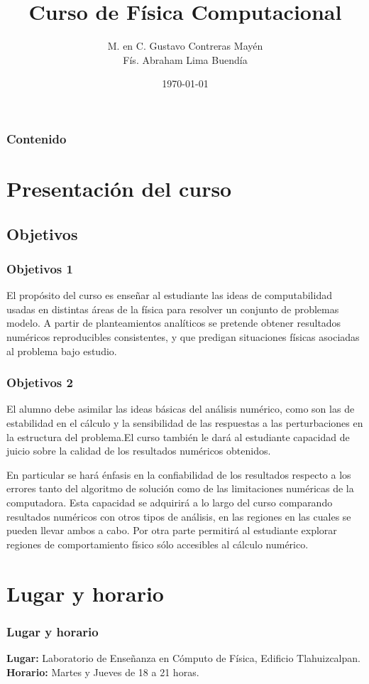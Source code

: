 \documentclass[12pt]{beamer}
\title{Curso de Física Computacional}
\author[]{M. en C. Gustavo Contreras Mayén \\ Fís. Abraham Lima Buendía}
\date{\today}
\begin{document}
\maketitle
\fontsize{14}{14}\selectfont
{}
\begin{frame}
\frametitle{Contenido}
\tableofcontents[pausesections]
\end{frame}
\section{Presentación del curso}
\subsection{Objetivos}
\begin{frame}
\frametitle{Objetivos 1}
El propósito del curso es enseñar al estudiante las ideas de computabilidad usadas en distintas áreas de la  física para resolver un conjunto de problemas modelo. A partir de planteamientos analíticos se pretende obtener resultados numéricos reproducibles consistentes, y que predigan situaciones físicas asociadas al problema bajo estudio.
\end{frame}
\begin{frame}
\frametitle{Objetivos 2}
El alumno debe asimilar las ideas básicas del análisis numérico, como son las de estabilidad en el cálculo y la sensibilidad de las respuestas a las perturbaciones en la estructura del problema.El curso también le dará al estudiante capacidad de juicio sobre la calidad de los resultados numéricos obtenidos.
\end{frame}
\begin{frame}
En particular se hará énfasis en la confiabilidad de los resultados respecto a los errores tanto del algoritmo de solución como de las limitaciones numéricas de la computadora. Esta capacidad se adquirirá a lo largo del curso comparando resultados numéricos con otros tipos de análisis, en las regiones en las cuales se pueden llevar ambos a cabo. Por otra parte permitirá al estudiante explorar regiones de comportamiento físico sólo accesibles al cálculo numérico.
\end{frame}
\section{Lugar y horario}
\begin{frame}
\frametitle{Lugar y horario} 
\textbf{Lugar: }Laboratorio de Enseñanza en Cómputo de Física, Edificio Tlahuizcalpan.
\\
\bigskip
\textbf{Horario: } Martes y Jueves de 18 a 21 horas.
\end{frame}
\end{document}
